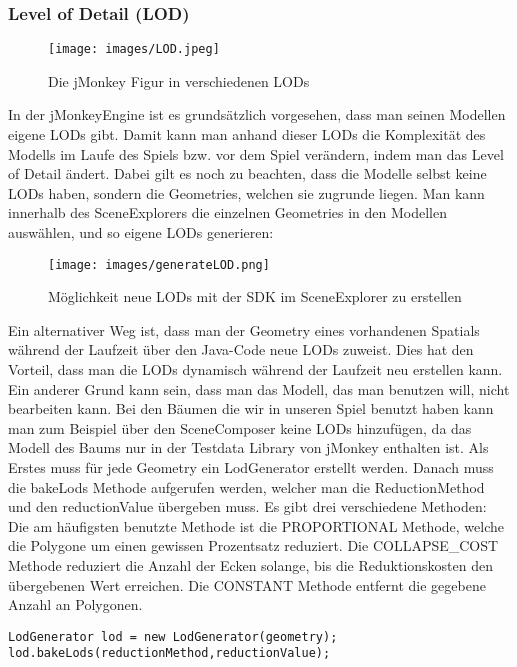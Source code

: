 \subsubsection{Level of Detail (LOD)}
\begin{figure}[h!]
	
	
	\caption{Die jMonkey Figur in verschiedenen LODs}
	
	\centering\texttt{[image: images/LOD.jpeg]}
	
\end{figure}  
In der jMonkeyEngine ist es grundsätzlich vorgesehen, dass man seinen Modellen eigene LODs gibt. Damit kann man anhand dieser LODs die Komplexität des Modells im Laufe des Spiels bzw. vor dem Spiel verändern, indem man das Level of Detail ändert. Dabei gilt es noch zu beachten, dass die Modelle selbst keine LODs haben, sondern die Geometries, welchen sie zugrunde liegen. Man kann innerhalb des SceneExplorers die einzelnen Geometries in den Modellen auswählen, und so eigene LODs generieren:\\
\begin{figure}[h!]
	
	\caption{Möglichkeit neue LODs mit der SDK im SceneExplorer zu erstellen}
	
	\centering\texttt{[image: images/generateLOD.png]}
	
\end{figure} 
Ein alternativer Weg ist, dass man der Geometry eines vorhandenen Spatials während der Laufzeit über den Java-Code neue LODs zuweist. Dies hat den Vorteil, dass man die LODs dynamisch während der Laufzeit neu erstellen kann. Ein anderer Grund kann sein, dass man das Modell, das man benutzen will, nicht bearbeiten kann. Bei den Bäumen die wir in unseren Spiel benutzt haben kann man zum Beispiel über den SceneComposer keine LODs hinzufügen, da das Modell des Baums nur in der Testdata Library von jMonkey enthalten ist. 
Als Erstes muss für jede Geometry ein LodGenerator erstellt werden. Danach muss die bakeLods Methode aufgerufen werden, welcher man die ReductionMethod und den reductionValue übergeben muss. Es gibt drei verschiedene Methoden: Die am häufigsten benutzte Methode ist die PROPORTIONAL Methode, welche die Polygone um einen gewissen Prozentsatz reduziert. Die COLLAPSE\_COST Methode reduziert die Anzahl der Ecken solange, bis die Reduktionskosten den übergebenen Wert erreichen. Die CONSTANT Methode entfernt die gegebene Anzahl an Polygonen.
\begin{lstlisting}
LodGenerator lod = new LodGenerator(geometry);
lod.bakeLods(reductionMethod,reductionValue);
\end{lstlisting}

